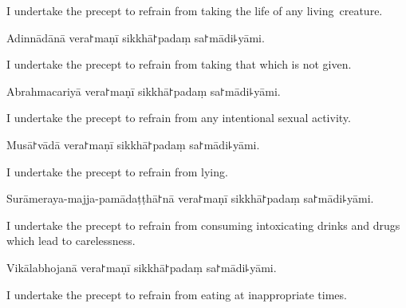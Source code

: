 \begin{english}
  I undertake the precept to refrain from taking the life of any living~creature.
\end{english}

\begin{precept}
  \setcounter{enumi}{1}
  \item Adinnādānā vera꜓maṇī sikkhā꜓padaṃ sa꜓mādi꜕yāmi.
\end{precept}

\begin{english}
  I undertake the precept to refrain from taking that which is not given.
\end{english}

\begin{precept}
  \setcounter{enumi}{2}
  \item Abrahmacariyā vera꜓maṇī sikkhā꜓padaṃ sa꜓mādi꜕yāmi.
\end{precept}

\begin{english}
  I undertake the precept to refrain from any intentional sexual activity.
\end{english}

\clearpage

\begin{precept}
  \setcounter{enumi}{3}
  \item Musā꜓vādā vera꜓maṇī sikkhā꜓padaṃ sa꜓mādi꜕yāmi.
\end{precept}

\begin{english}
  I undertake the precept to refrain from lying.
\end{english}

\begin{precept}
  \setcounter{enumi}{4}
  \item Surāmeraya-majja-pamādaṭṭhā꜓nā vera꜓maṇī sikkhā꜓padaṃ sa꜓mādi꜕yāmi.
\end{precept}

\begin{english}
  I undertake the precept to refrain from consuming intoxicating drinks and drugs which lead to carelessness.
\end{english}

\begin{precept}
  \setcounter{enumi}{5}
  \item Vikālabhojanā vera꜓maṇī sikkhā꜓padaṃ sa꜓mādi꜕yāmi.
\end{precept}

\begin{english}
  I undertake the precept to refrain from eating at inappropriate times.
\end{english}

